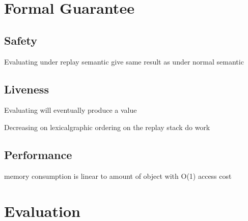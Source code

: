 \documentclass[acmsmall]{acmart}
\begin{document}
	\section{Formal Guarantee}
	\subsection{Safety}
	Evaluating under replay semantic give same result as under normal semantic
	\subsection{Liveness}
	Evaluating will eventually produce a value
	
	Decreasing on lexicalgraphic ordering on the replay stack do work
	\subsection{Performance}
	memory consumption is linear to amount of object with O(1) access cost
	\section{Evaluation}
\appendix
\end{document}
